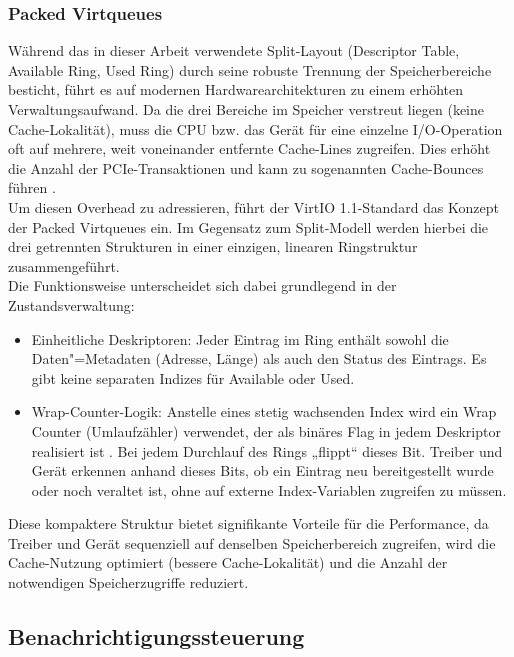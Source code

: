 \subsubsection{Packed Virtqueues}
\label{sssec:packed-virtqueues}

Während das in dieser Arbeit verwendete Split-Layout (Descriptor Table, Available Ring, Used Ring) durch seine robuste Trennung der Speicherbereiche besticht, führt es auf modernen Hardwarearchitekturen zu einem erhöhten Verwaltungsaufwand. Da die drei Bereiche im Speicher verstreut liegen (keine Cache-Lokalität), muss die CPU bzw. das Gerät für eine einzelne I/O-Operation oft auf mehrere, weit voneinander entfernte Cache-Lines zugreifen. Dies erhöht die Anzahl der PCIe-Transaktionen und kann zu sogenannten Cache-Bounces führen \cite{RedHatPacked}.\\

Um diesen Overhead zu adressieren, führt der VirtIO 1.1-Standard das Konzept der Packed Virtqueues ein. Im Gegensatz zum Split-Modell werden hierbei die drei getrennten Strukturen in einer einzigen, linearen Ringstruktur zusammengeführt.\\

Die Funktionsweise unterscheidet sich dabei grundlegend in der Zustandsverwaltung:

\begin{itemize}
 \item Einheitliche Deskriptoren: Jeder Eintrag im Ring enthält sowohl die Daten"=Metadaten (Adresse, Länge) als auch den Status des Eintrags. Es gibt keine separaten Indizes für Available oder Used.
 \item Wrap-Counter-Logik: Anstelle eines stetig wachsenden Index wird ein Wrap Counter (Umlaufzähler) verwendet, der als binäres Flag in jedem Deskriptor realisiert ist \cite{RedHatPacked}. Bei jedem Durchlauf des Rings „flippt“ dieses Bit. Treiber und Gerät erkennen anhand dieses Bits, ob ein Eintrag neu bereitgestellt wurde oder noch veraltet ist, ohne auf externe Index-Variablen zugreifen zu müssen.
\end{itemize}

Diese kompaktere Struktur bietet signifikante Vorteile für die Performance, da Treiber und Gerät sequenziell auf denselben Speicherbereich zugreifen, wird die Cache-Nutzung optimiert (bessere Cache-Lokalität) und die Anzahl der notwendigen Speicherzugriffe reduziert.

\subsection{Benachrichtigungssteuerung}

